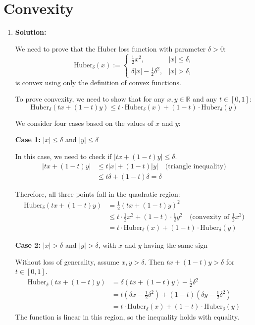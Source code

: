 \section{Convexity}

\begin{enumerate}
    \item \textbf{Solution:}
    
    We need to prove that the Huber loss function with parameter $\delta > 0$:
    \[
    \text{Huber}_\delta(x) := \begin{cases}
    \frac{1}{2}x^2, & |x| \leq \delta, \\
    \delta|x| - \frac{1}{2}\delta^2, & |x| > \delta,
    \end{cases}
    \]
    is convex using only the definition of convex functions.
    
    To prove convexity, we need to show that for any $x, y \in \mathbb{R}$ and any $t \in [0,1]$:
    \[
    \text{Huber}_\delta(tx + (1-t)y) \leq t\cdot\text{Huber}_\delta(x) + (1-t)\cdot\text{Huber}_\delta(y)
    \]
    
    We consider four cases based on the values of $x$ and $y$:
    
    \textbf{Case 1:} $|x| \leq \delta$ and $|y| \leq \delta$
    
    In this case, we need to check if $|tx + (1-t)y| \leq \delta$.
    \begin{align*}
    |tx + (1-t)y| &\leq t|x| + (1-t)|y| \quad \text{(triangle inequality)}\\
    &\leq t\delta + (1-t)\delta = \delta
    \end{align*}
    
    Therefore, all three points fall in the quadratic region:
    \begin{align*}
    \text{Huber}_\delta(tx + (1-t)y) &= \frac{1}{2}(tx + (1-t)y)^2 \\
    &\leq t\cdot\frac{1}{2}x^2 + (1-t)\cdot\frac{1}{2}y^2 \quad \text{(convexity of $\frac{1}{2}x^2$)}\\
    &= t\cdot\text{Huber}_\delta(x) + (1-t)\cdot\text{Huber}_\delta(y)
    \end{align*}
    
    \textbf{Case 2:} $|x| > \delta$ and $|y| > \delta$, with $x$ and $y$ having the same sign
    
    Without loss of generality, assume $x, y > \delta$. Then $tx + (1-t)y > \delta$ for $t \in [0,1]$.
    \begin{align*}
    \text{Huber}_\delta(tx + (1-t)y) &= \delta(tx + (1-t)y) - \frac{1}{2}\delta^2 \\
    &= t(\delta x - \frac{1}{2}\delta^2) + (1-t)(\delta y - \frac{1}{2}\delta^2) \\
    &= t\cdot\text{Huber}_\delta(x) + (1-t)\cdot\text{Huber}_\delta(y)
    \end{align*}
    The function is linear in this region, so the inequality holds with equality.
    

\end{enumerate}
